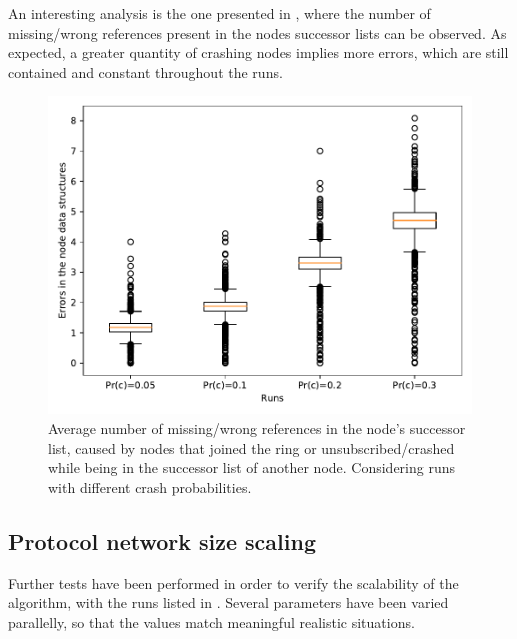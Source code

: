 \documentclass[11pt,twocolumn,letterpaper]{article}
\begin{document}
		An interesting analysis is the one presented in , where the number of missing/wrong references present in the nodes successor lists can be observed. As expected, a greater quantity of crashing nodes implies more errors, which are still contained and constant throughout the runs.
		
		\begin{figure}[!h]
			\centering
			\includegraphics[width=\linewidth,clip,trim=0 0.5cm 0 0.35cm]{figures/analysis1/errors_box.pdf}
			\caption{Average number of missing/wrong references in the node's successor list, caused by nodes that joined the ring or unsubscribed/crashed while being in the successor list of another node. Considering runs with different crash probabilities.}
			\label{fig:crash7}
		\end{figure}
	
	\subsection{Protocol network size scaling}
	\label{subsec:netsize_analysis}
	Further tests have been performed in order to verify the scalability of the algorithm, with the runs listed in . Several parameters have been varied parallelly, so that the values match meaningful realistic situations. 
\end{document}
